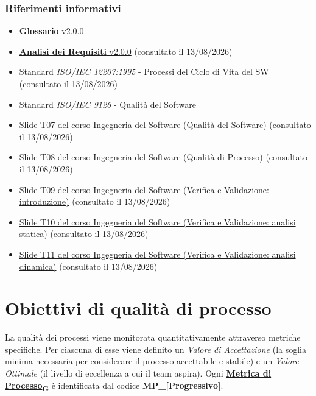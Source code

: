 \documentclass[12pt, a4paper]{article}
\newcommand{\urlglossario}{https://skynetunigroup.github.io/Code_Guardian/Documentazione/PB/glossario_v2.0.0.pdf} %
\newcommand{\glo}[2]{\href{\urlglossario\#nameddest=#2}{#1\textsubscript{G}}}
\begin{document}
\subsubsection{Riferimenti informativi}
\begin{itemize}
\item
  \href{https://skynetunigroup.github.io/Code_Guardian/Documentazione/PB/glossario_v2.0.0.pdf}{\textbf{Glossario} v2.0.0}
\item
  \href{https://skynetunigroup.github.io/Code_Guardian/Documentazione/PB/analisi_dei_requisiti_v2.0.0.pdf}{\textbf{Analisi dei Requisiti} v2.0.0} (consultato il 13/08/2026)
\item
  \href{https://www.math.unipd.it/~tullio/IS-1/2009/Approfondimenti/ISO_12207-1995.pdf}{Standard \textit{ISO/IEC 12207:1995} - Processi del Ciclo di Vita del SW} (consultato il 13/08/2026)
\item
  Standard \textit{ISO/IEC 9126} - Qualità del Software
\item
  \href{https://www.math.unipd.it/~tullio/IS-1/2025/Dispense/T07.pdf}{Slide T07 del corso Ingegneria del Software (Qualità del Software)} (consultato il 13/08/2026)
\item
  \href{https://www.math.unipd.it/~tullio/IS-1/2025/Dispense/T08.pdf}{Slide T08 del corso  Ingegneria del Software (Qualità di Processo)} (consultato il 13/08/2026)
\item
  \href{https://www.math.unipd.it/~tullio/IS-1/2025/Dispense/T09.pdf}{Slide T09 del corso  Ingegneria del Software (Verifica e Validazione: introduzione)} (consultato il 13/08/2026)
\item
  \href{https://www.math.unipd.it/~tullio/IS-1/2025/Dispense/T10.pdf}{Slide T10 del corso  Ingegneria del Software (Verifica e Validazione: analisi statica)} (consultato il 13/08/2026)
\item
  \href{https://www.math.unipd.it/~tullio/IS-1/2025/Dispense/T11.pdf}{Slide T11 del corso  Ingegneria del Software (Verifica e Validazione: analisi dinamica)} (consultato il 13/08/2026)

\end{itemize}

\newpage
\section{Obiettivi di qualità di processo}

La qualità dei processi viene monitorata quantitativamente attraverso metriche specifiche. Per ciascuna di esse viene definito un \textit{Valore di Accettazione} (la soglia minima necessaria per considerare il processo accettabile e stabile) e un \textit{Valore Ottimale} (il livello di eccellenza a cui il team aspira). Ogni \textbf{\glo{Metrica di Processo}{metrica-di-processo}} è identificata dal codice \textbf{MP\_[Progressivo]}.
\end{document}
